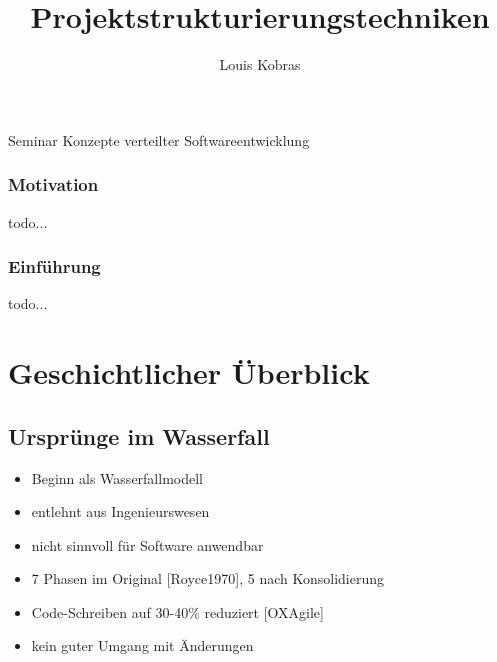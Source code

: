 \documentclass[%
	handout
]{beamer}
\author{Louis Kobras}
\title{Projektstrukturierungstechniken}
\newcommand{\waterfall}{[Royce1970]}
\newcommand{\waterfallmodel}{[OXAgile]}
\begin{document}
\begin{frame}
	\maketitle
	\vspace{-0.2cm}
	\begin{center}
		Seminar Konzepte verteilter Softwareentwicklung
	\end{center}
\end{frame}

\begin{frame}
	\frametitle{Motivation}
	todo...
\end{frame}

\begin{frame}
	\frametitle{Einführung}
	todo...
\end{frame}

\begin{frame}
	\tableofcontents
\end{frame}

\section{Geschichtlicher Überblick}
	\subsection{Ursprünge im Wasserfall}
		\begin{frame}
			\begin{itemize}
				\item Beginn als Wasserfallmodell\pause
				\item entlehnt aus Ingenieurswesen\pause
				\item nicht sinnvoll für Software anwendbar\pause
			\end{itemize}
			\pause
			\begin{itemize}
				\item 7 Phasen im Original \waterfall\pause, 5 nach Konsolidierung\pause
				\item Code-Schreiben auf 30-40\% reduziert \waterfallmodel\pause
				\item kein guter Umgang mit Änderungen
			\end{itemize}
		\end{frame}
		
\end{document}
